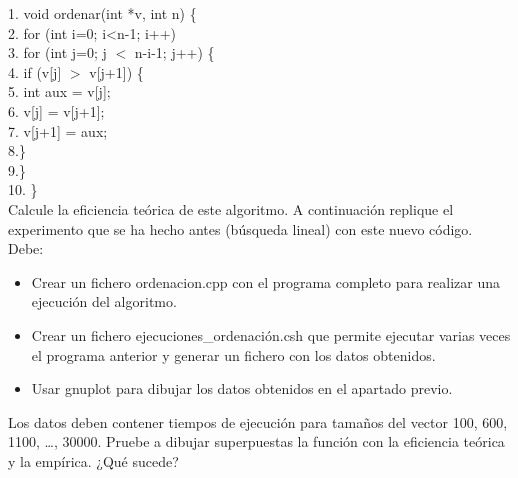 \documentclass[titlepage, 12pt,a4paper]{article}
\begin{document}
	\hspace*{1cm}1. void ordenar(int *v, int n) \{ \\
	\hspace*{1cm}2.\hspace*{2em}	for (int i=0; i<n-1; i++)\\
	\hspace*{1cm}3.\hspace*{4em}		for (int j=0; j $<$ n-i-1; j++) \{ \\
	\hspace*{1cm}4.\hspace*{6em}			if (v[j] $>$ v[j+1]) \{\\
	\hspace*{1cm}5.\hspace*{8em}				int aux = v[j];\\
	\hspace*{1cm}6.\hspace*{8em}				v[j] = v[j+1];\\
	\hspace*{1cm}7.\hspace*{8em}				v[j+1] = aux;\\
	\hspace*{1cm}8.\hspace*{6em}\} \\
	\hspace*{1cm}9.\hspace*{4em}\} \\
	\hspace*{1cm}10. \}  \vspace {1em} \\
Calcule la eficiencia teórica de este algoritmo. A continuación replique el experimento que se ha hecho antes (búsqueda lineal) con este nuevo código. Debe:\\ 
	\begin{itemize}  
	\item Crear un fichero ordenacion.cpp con el programa completo para realizar una
ejecución del algoritmo.
	\item Crear un fichero ejecuciones\_ordenación.csh que permite ejecutar varias veces el programa anterior y generar un fichero con los datos obtenidos. 
	\item Usar gnuplot para dibujar los datos obtenidos en el apartado previo.
	\end{itemize}
Los datos deben contener tiempos de ejecución para tamaños del vector 100, 600, 1100, \ldots,  30000. Pruebe a dibujar superpuestas la función con la eficiencia teórica y la empírica. ¿Qué sucede?\\
\end{document}
